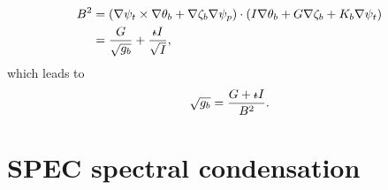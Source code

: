\begin{align}
	B^2 &= (\nabla\psi_t\times\nabla\theta_b+\nabla\zeta_b\nabla\psi_p)\cdot(I\nabla\theta_b+G\nabla\zeta_b+K_b\nabla\psi_t)\\
	&= \frac{G}{\sqrt{g_b}} + \frac{\text{$\iota\!\!$-} I}{\sqrt{I}},
\end{align}
which leads to
\begin{equation}
	\sqrt{g_b} = \frac{G+\text{$\iota\!\!$-} I}{B^2}.\label{eq.jacobian_boozer}
\end{equation}






\chapter{SPEC spectral condensation} \label{spec coord and spectral constraints}
%
%

